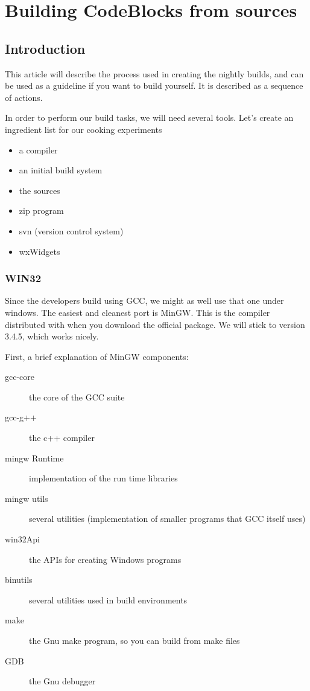 \chapter{Building CodeBlocks from sources}\label{sec:build_codeblocks}

\section{Introduction}

This article will describe the process used in creating the nightly builds, and can be used as a guideline if you want to build \codeblocks yourself. It is described as a sequence of actions.

In order to perform our build tasks, we will need several tools. Let's create an ingredient list for our cooking experiments

\begin{itemize}
\item a compiler
\item an initial build system
\item the \codeblocks sources
\item zip program
\item svn (version control system)
\item wxWidgets
\end{itemize}

\subsection{WIN32}

Since the \codeblocks developers build \codeblocks using GCC, we might as well use that one under windows. The easiest and cleanest port is MinGW. This is the compiler distributed with \codeblocks when you download the official package. We will stick to version 3.4.5, which works nicely.

First, a brief explanation of MinGW components:

\begin{description}
\item[gcc-core] the core of the GCC suite
\item[gcc-g++] the c++ compiler
\item[mingw Runtime] implementation of the run time libraries
\item[mingw utils] several utilities (implementation of smaller programs that GCC itself uses)
\item[win32Api] the APIs for creating Windows programs
\item[binutils] several utilities used in build environments
\item[make] the Gnu make program, so you can build from make files
\item[GDB] the Gnu debugger
\end{description}

